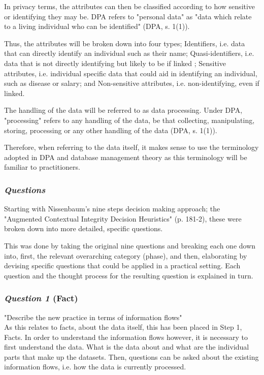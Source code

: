 In privacy terms, the attributes can then be classified according to how sensitive or identifying they may be. DPA refers to "personal data" as "data which relate to a living individual who can be identified" (DPA, s. 1(1)). 

Thus, the attributes will be broken down into four types; Identifiers, i.e. data that can directly identify an individual such as their name; Quasi-identifiers, i.e. data that is not directly identifying but likely to be if linked \citep{Thomson_et_al_2005}; Sensitive attributes, i.e. individual specific data that could aid in identifying an individual, such as disease or salary\citep{Fung_et_al_2010}; and Non-sensitive attributes, i.e. non-identifying, even if linked.

The handling of the data will be referred to as data processing. Under DPA, "processing" refers to any handling of the data, be that collecting, manipulating, storing, processing or any other handling of the data (DPA, s. 1(1)). 

Therefore, when referring to the data itself, it makes sense to use the terminology adopted in DPA and database management theory as this terminology will be familiar to practitioners.
 
\subsubsection {{\it Questions}}

Starting with Nissenbaum's nine steps decision making approach; the "Augmented Contextual Integrity Decision Heuristics" (p. 181-2), these were broken down into more detailed, specific questions.

This was done by taking the original nine questions and breaking each one down into, first, the relevant overarching category (phase), and then, elaborating by devising specific questions that could be applied in a practical setting. Each question and the thought process for the resulting question is explained in turn.

\subsubsection {{\it Question 1} {\bf (Fact)}}

"Describe the new practice in terms of information flows" \citep{Nissenbaum_2010}\\

As this relates to facts, about the data itself, this has been placed in Step 1, Facts. In order to understand the information flows however, it is necessary to first understand the data. What is the data about and what are the individual parts that make up the datasets. Then, questions can be asked about the existing information flows, i.e. how the data is currently processed.

